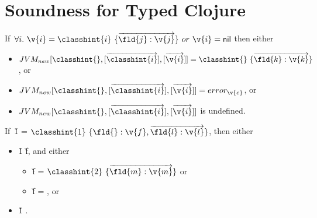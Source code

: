 \section{Soundness for Typed Clojure}

\begin{assumption}[\newjavaliteral] \label{assumption:new}
  If\ $\forall i.\ {\v{i}} = {\classvalue{\classhint{i}}{\overrightarrow{\classfieldpair{\fld{j}} {\v{j}}}}}\ or\ {\v{i}}= {\nil}$
  then either
  \begin{itemize}
  \item $\newjava {\classhint{}}
                {\overrightarrow{\classhint{i}}}
                {\overrightarrow{\v{i}}}
                {\classvalue{\classhint{}}{\overrightarrow {\classfieldpair{\fld{k}} {\v{k}}}}}$, or
  \item 
        $\newjava {\classhint{}}
                {\overrightarrow{\classhint{i}}}
                {\overrightarrow{\v{i}}}
                {\errorval{\v{e}}}$, or
  \item $\newjavanoeq {\classhint{}}
                {\overrightarrow{\classhint{i}}}
                {\overrightarrow{\v{i}}}$
                is undefined.
  \end{itemize}
\end{assumption}

\begin{assumption}[\getfieldliteral] \label{assumption:field}
  If\ {\v{1}} = ${\classvalue{\classhint{1}}{{\classfieldpair{\fld{}}{\v{f}}, {\overrightarrow{\classfieldpair{\fld{l}} {\v{l}}}}}}}$,
  then either
  \begin{itemize}
    \item
       {\v{1}} {\fld{}} {}{\v{f}},
                  and either
                  \begin{itemize}
                    \item
                  \v{f} = ${\classvalue{\classhint{2}}{\overrightarrow{\classfieldpair{\fld{m}} {\v{m}}}}}$
                   or 
                    \item
                  \v{f} = \nil, or
                  \end{itemize}
    \item
       {\v{1}} {\fld{}} {} {}.
  \end{itemize}
\end{assumption}


